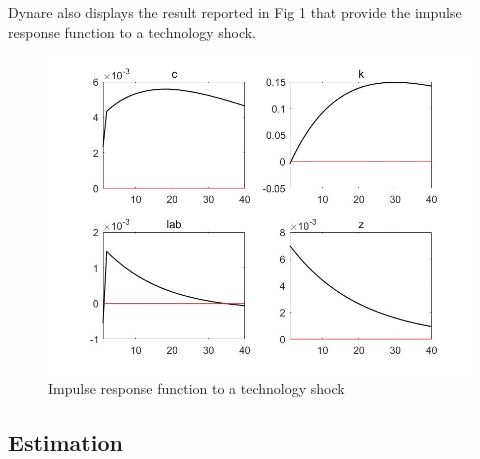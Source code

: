 \documentclass[a4paper,12pt]{scrartcl} %
\begin{document}
Dynare also displays the result reported in Fig 1 that provide the impulse response function to a technology shock.

\begin{figure}[htbp!]
		\centering
			\includegraphics[width=0.6\linewidth]{fig1.jpg}
            \caption{Impulse response function to a technology shock}\label{1}
\end{figure}



\subsection{Estimation}
\end{document}
